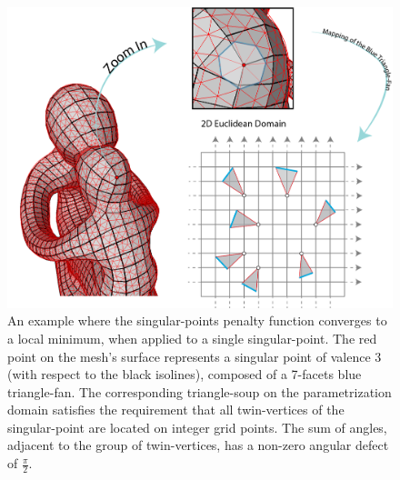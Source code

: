 \begin{figure}[ht]
\centering
\includegraphics[width=16cm]{figures/singular_points/singular_points_penalty_function_minimum.png}
\caption[Singular-Points Penalty Function Global Minimum Example]{An example where the singular-points penalty function converges to a local minimum, when applied to a single singular-point. The red point on the mesh's surface represents a singular point of valence 3 (with respect to the black isolines), composed of a 7-facets blue triangle-fan. The corresponding triangle-soup on the parametrization domain satisfies the requirement that all twin-vertices of the singular-point are located on integer grid points. The sum of angles, adjacent to the group of twin-vertices, has a non-zero angular defect of $\frac{\pi}{2}$.}
\label{fig:singular_points_penalty_minimum}
\end{figure}
